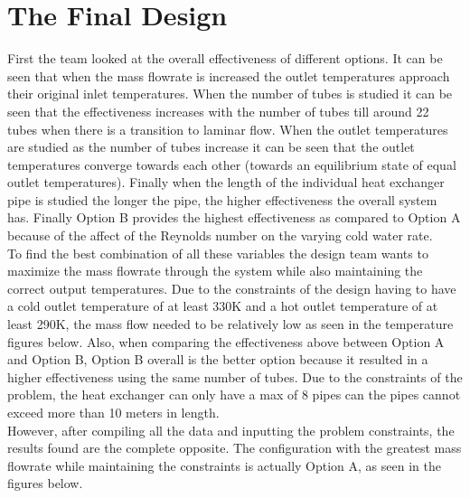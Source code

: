 \section{The Final Design}
%
First the team looked at the overall effectiveness of different options. It can be seen that when the mass flowrate is increased the outlet temperatures approach their original inlet temperatures. When the number of tubes is studied it can be seen that the effectiveness increases with the number of tubes till around 22 tubes when there is a transition to laminar flow. When the outlet temperatures are studied as the number of tubes increase it can be seen that the outlet temperatures converge towards each other (towards an equilibrium state of equal outlet temperatures). Finally when the length of the individual heat exchanger pipe is studied the longer the pipe, the higher effectiveness the overall system has. Finally Option B provides the highest effectiveness as compared to Option A because of the affect of the Reynolds number on the varying cold water rate. \\
%
\indent
To find the best combination of all these variables the design team wants to maximize the mass flowrate through the system while also maintaining the correct output temperatures. Due to the constraints of the design having to have a cold outlet temperature of at least 330K and a hot outlet temperature of at least 290K, the mass flow needed to be relatively low as seen in the temperature figures below. Also, when comparing the effectiveness above between Option A and Option B, Option B overall is the better option because it resulted in a higher effectiveness using the same number of tubes. Due to the constraints of the problem, the heat exchanger can only have a max of 8 pipes can the pipes cannot exceed more than 10 meters in length.\\
%
\indent
However, after compiling all the data and inputting the problem constraints, the results found are the complete opposite. The configuration with the greatest mass flowrate while maintaining the constraints is actually Option A, as seen in the figures below. \\ \\
%
\begin{figure}[H]
  \centering
\end{figure}
